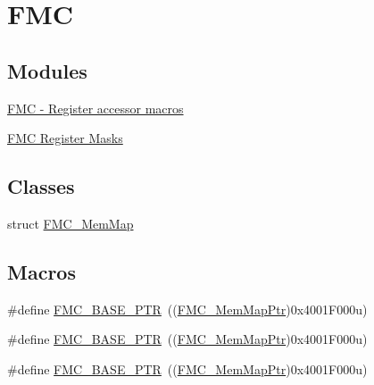 \hypertarget{group___f_m_c___peripheral}{}\section{F\+MC}
\label{group___f_m_c___peripheral}
\subsection*{Modules}
\begin{DoxyCompactItemize}
\item 
\hyperlink{group___f_m_c___register___accessor___macros}{F\+M\+C -\/ Register accessor macros}
\item 
\hyperlink{group___f_m_c___register___masks}{F\+M\+C Register Masks}
\end{DoxyCompactItemize}
\subsection*{Classes}
\begin{DoxyCompactItemize}
\item 
struct \hyperlink{struct_f_m_c___mem_map}{F\+M\+C\+\_\+\+Mem\+Map}
\end{DoxyCompactItemize}
\subsection*{Macros}
\begin{DoxyCompactItemize}
\item 
\#define \hyperlink{group___f_m_c___peripheral_ga0a740437b573e32e6b932bf729485fd9}{F\+M\+C\+\_\+\+B\+A\+S\+E\+\_\+\+P\+TR}~((\hyperlink{group___f_m_c___peripheral_ga0552c12b8b29667270d15450ed977a6e}{F\+M\+C\+\_\+\+Mem\+Map\+Ptr})0x4001\+F000u)
\item 
\#define \hyperlink{group___f_m_c___peripheral_ga0a740437b573e32e6b932bf729485fd9}{F\+M\+C\+\_\+\+B\+A\+S\+E\+\_\+\+P\+TR}~((\hyperlink{group___f_m_c___peripheral_ga0552c12b8b29667270d15450ed977a6e}{F\+M\+C\+\_\+\+Mem\+Map\+Ptr})0x4001\+F000u)
\item 
\#define \hyperlink{group___f_m_c___peripheral_ga0a740437b573e32e6b932bf729485fd9}{F\+M\+C\+\_\+\+B\+A\+S\+E\+\_\+\+P\+TR}~((\hyperlink{group___f_m_c___peripheral_ga0552c12b8b29667270d15450ed977a6e}{F\+M\+C\+\_\+\+Mem\+Map\+Ptr})0x4001\+F000u)
\end{DoxyCompactItemize}
